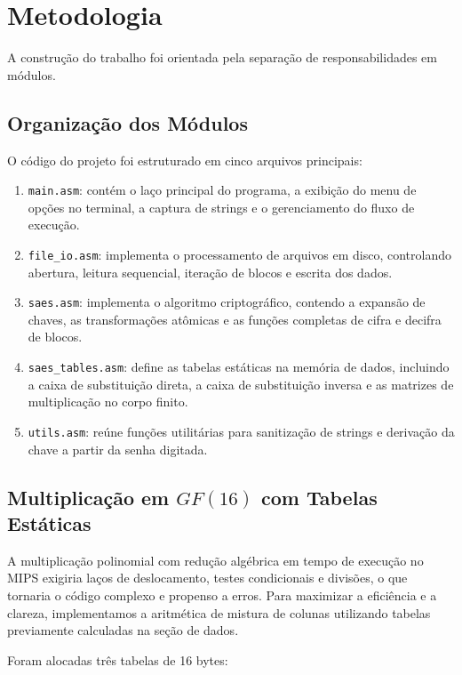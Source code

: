 \documentclass[12pt,a4paper]{article}
\begin{document}
\section{Metodologia}

A construção do trabalho foi orientada pela separação de responsabilidades em módulos.

\subsection{Organização dos Módulos}

O código do projeto foi estruturado em cinco arquivos principais:

\begin{enumerate}
    \item \texttt{main.asm}: contém o laço principal do programa, a exibição do menu de opções no terminal, a captura de strings e o gerenciamento do fluxo de execução.
    \item \texttt{file\_io.asm}: implementa o processamento de arquivos em disco, controlando abertura, leitura sequencial, iteração de blocos e escrita dos dados.
    \item \texttt{saes.asm}: implementa o algoritmo criptográfico, contendo a expansão de chaves, as transformações atômicas e as funções completas de cifra e decifra de blocos.
    \item \texttt{saes\_tables.asm}: define as tabelas estáticas na memória de dados, incluindo a caixa de substituição direta, a caixa de substituição inversa e as matrizes de multiplicação no corpo finito.
    \item \texttt{utils.asm}: reúne funções utilitárias para sanitização de strings e derivação da chave a partir da senha digitada.
\end{enumerate}

\subsection{Multiplicação em \texorpdfstring{$GF(16)$}{GF(16)} com Tabelas Estáticas}

A multiplicação polinomial com redução algébrica em tempo de execução no MIPS exigiria laços de deslocamento, testes condicionais e divisões, o que tornaria o código complexo e propenso a erros. Para maximizar a eficiência e a clareza, implementamos a aritmética de mistura de colunas utilizando tabelas previamente calculadas na seção de dados.

Foram alocadas três tabelas de 16 bytes:
\end{document}
